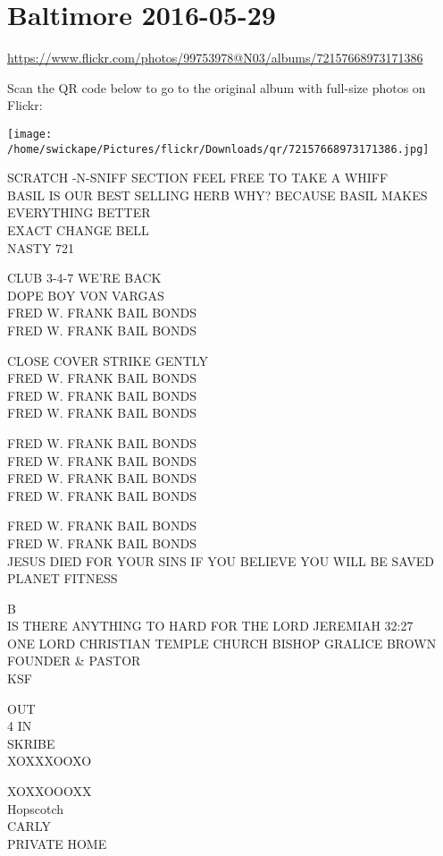 \documentclass[10pt,letterpaper]{article}
\begin{document}
\section*{Baltimore 2016-05-29}

\url{https://www.flickr.com/photos/99753978@N03/albums/72157668973171386}

Scan the QR code below to go to the original album with full-size photos on Flickr:

\texttt{[image: /home/swickape/Pictures/flickr/Downloads/qr/72157668973171386.jpg]}


SCRATCH {-}N{-}SNIFF SECTION FEEL FREE TO TAKE A WHIFF\\
BASIL IS OUR BEST SELLING HERB WHY?  BECAUSE BASIL MAKES EVERYTHING BETTER\\
EXACT CHANGE BELL\\
NASTY 721

CLUB 3{-}4{-}7 WE'RE BACK\\
DOPE BOY VON VARGAS\\
FRED W. FRANK BAIL BONDS\\
FRED W. FRANK BAIL BONDS

CLOSE COVER STRIKE GENTLY\\
FRED W. FRANK BAIL BONDS\\
FRED W. FRANK BAIL BONDS\\
FRED W. FRANK BAIL BONDS

FRED W. FRANK BAIL BONDS\\
FRED W. FRANK BAIL BONDS\\
FRED W. FRANK BAIL BONDS\\
FRED W. FRANK BAIL BONDS

FRED W. FRANK BAIL BONDS\\
FRED W. FRANK BAIL BONDS\\
JESUS DIED FOR YOUR SINS IF YOU BELIEVE YOU WILL BE SAVED\\
PLANET FITNESS

B\\
IS THERE ANYTHING TO HARD FOR THE LORD JEREMIAH 32:27\\
ONE LORD CHRISTIAN TEMPLE CHURCH BISHOP GRALICE BROWN FOUNDER \& PASTOR\\
KSF

OUT\\
4 IN\\
SKRIBE\\
XOXXXOOXO

XOXXOOOXX\\
Hopscotch\\
CARLY\\
PRIVATE HOME
\end{document}
